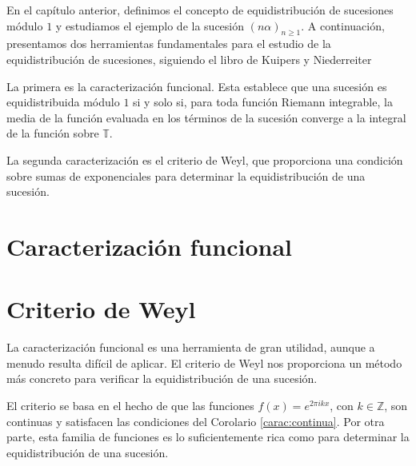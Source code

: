 En el capítulo anterior, definimos el concepto de equidistribución de sucesiones módulo $1$
y estudiamos el ejemplo de la sucesión $(n\alpha)_{n\geq1}$. A continuación, presentamos
dos herramientas fundamentales para el estudio de la equidistribución de sucesiones, siguiendo el libro de Kuipers y Niederreiter \cite[Capítulos 1--2]{kuipers-1974}

La primera es la caracterización funcional. Esta establece que una sucesión es equidistribuida 
módulo $1$ si y solo si, para toda función Riemann integrable, la media de la función evaluada
en los términos de la sucesión converge a la integral de la función sobre $\mathbb{T}$.

La segunda caracterización es el criterio de Weyl, que proporciona una condición sobre
sumas de exponenciales para determinar la equidistribución de una sucesión.

\section{Caracterización funcional}





\section{Criterio de Weyl}

La caracterización funcional es una herramienta de gran utilidad, aunque a menudo resulta difícil de aplicar. 
El criterio de Weyl nos proporciona un método más concreto para verificar la equidistribución de una sucesión.

El criterio se basa en el hecho de que las funciones $f(x)=e^{2\pi i k x}$, con $k \in \mathbb{Z}$, son continuas
y satisfacen las condiciones del Corolario \ref{carac:continua}. Por otra parte, esta familia
de funciones es lo suficientemente rica como para determinar la equidistribución de una sucesión.









